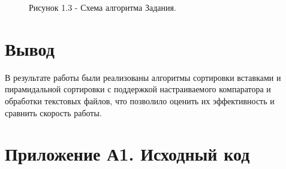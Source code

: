 \documentclass[oneside,a4paper,14pt]{extarticle}
\begin{document}
\clearpage
\begin{figure}[H]
	\centering
	\caption*{Рисунок 1.3 - Схема алгоритма Задания.}
\end{figure}

\section*{Вывод}


В результате работы были реализованы алгоритмы сортировки вставками и пирамидальной сортировки с поддержкой настраиваемого компаратора и обработки текстовых файлов, что позволило оценить их эффективность и сравнить скорость работы.
\newpage
\section*{Приложение А1. Исходный код}
\inputminted{pascal}{code/main.pas}
\end{document}
